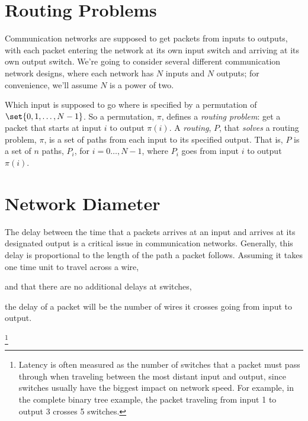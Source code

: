 \section{Routing Problems}

Communication networks are supposed to get packets from inputs to outputs,
with each packet entering the network at its own input switch and arriving
at its own output switch.  We're going to consider several different
communication network designs, where each network has $N$ inputs and
$N$ outputs; for convenience, we'll assume $N$ is a power of two.

Which input is supposed to go where is specified by a permutation of
$\set{0, 1, \dots, N - 1}$.  So a permutation, $\pi$, defines a 
\emph{routing problem}: get a packet that starts at input $i$ to output
$\pi(i)$.  A \emph{routing},%
%
$P$, that \emph{solves} a routing problem,
$\pi$, is a set of paths from each input to its specified output.  That
is, $P$ is a set of $n$ paths, $P_i$, for $i=0\dots,N-1$, where $P_i$ goes
from input $i$ to output $\pi(i)$.

\section{Network Diameter}

The delay between the time that a packets arrives at an input and arrives
at its designated output is a critical issue in communication networks.
Generally, this delay is proportional to the length of the path a packet
follows.  Assuming it takes one time unit to travel across a wire,
\begin{editingnotes}
and that there are no additional delays at switches,
\end{editingnotes}
the delay of a packet will be the number of wires it crosses going from
input to output.

\begin{editingnotes}

\footnote{Latency is often measured as the number of switches that
a packet must pass through when traveling between the most distant input
and output, since switches usually have the biggest impact on network
speed.  For example, in the complete binary tree example, the packet
traveling from input 1 to output 3 crosses 5 switches.}

\end{editingnotes}

